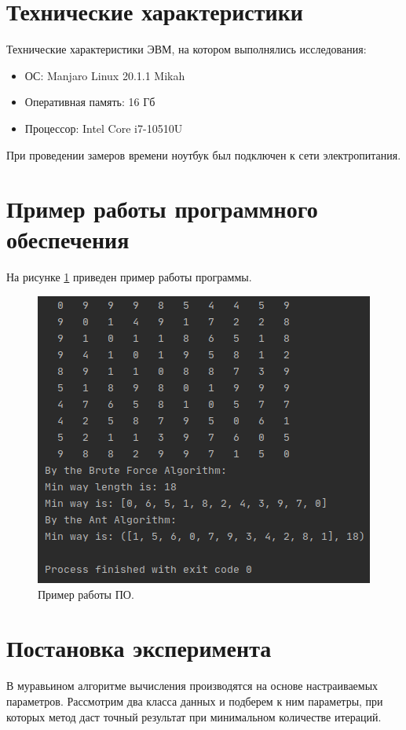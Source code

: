 \documentclass[12pt]{report}
\begin{document}
\section{Технические характеристики}
Технические характеристики ЭВМ, на котором выполнялись исследования:
\begin{itemize}
\item ОС: Manjaro Linux 20.1.1 Mikah
\item Оперативная память: 16 Гб
\item Процессор: Intel Core i7-10510U
\end{itemize}

При проведении замеров времени ноутбук был подключен к сети электропитания.

\section{Пример работы программного обеспечения}
На рисунке \ref{img:example} приведен пример работы программы.

\begin{figure}
\begin{center}
\includegraphics[scale=0.9]{inc/img/example.png}
\captionsetup{justification=centering}
	\caption{Пример работы ПО.}
	\label{img:example}	
\end{center}
\end{figure}

\newpage
\section{Постановка эксперимента}
В муравьином алгоритме вычисления производятся на основе настраиваемых параметров.
Рассмотрим два класса данных и подберем к ним параметры, при которых метод даст точный результат при минимальном количестве итераций.
\end{document}
